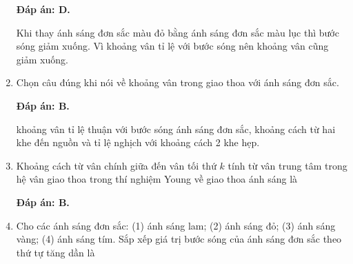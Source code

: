 \begin{enumerate}[label=\bfseries Câu \arabic*:]
	\loigiai
	{		\textbf{Đáp án: D.}
		
		Khi thay ánh sáng đơn sắc màu đỏ bằng ánh sáng đơn sắc màu lục thì bước sóng giảm xuống. Vì khoảng vân tỉ lệ với bước sóng nên khoảng vân cũng giảm xuống.
		
	}	
		\item {} 
	\cauhoi
	{
		Chọn câu đúng khi nói về khoảng vân trong giao thoa với ánh sáng đơn sắc.
		
		
	}
	
	\loigiai
	{		\textbf{Đáp án: B.}
		
		
		khoảng vân tỉ lệ thuận với bước sóng ánh sáng đơn sắc, khoảng cách từ hai khe đến nguồn và tỉ lệ nghịch với khoảng cách 2 khe hẹp.
	}
	\item {} 
	\cauhoi
	{
		Khoảng cách từ vân chính giữa đến vân tối thứ $k$ tính từ vân trung tâm trong hệ vân giao thoa trong thí nghiệm Young về giao thoa ánh sáng là
		
		
	}
	
	\loigiai
	{		\textbf{Đáp án: B.}
		
		
		
	}
	\item {} 
	\cauhoi
	{
		Cho các ánh sáng đơn sắc: (1) ánh sáng lam; (2) ánh sáng đỏ; (3) ánh sáng vàng; (4) ánh sáng tím. Sắp xếp giá trị bước sóng của ánh sáng đơn sắc theo thứ tự tăng dần là
		
}
\end{enumerate}
